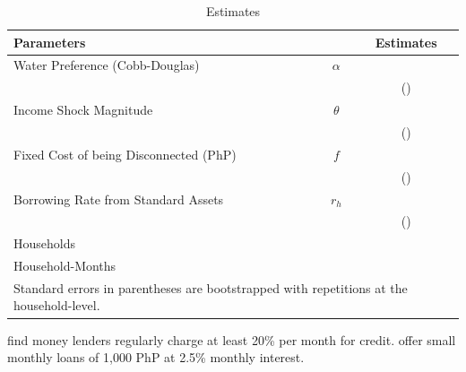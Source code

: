 \documentclass[12pt]{article}
\begin{document}
\begin{table}[h!]
\centering
\caption{Estimates}\label{table:estimates}
\vspace{-2mm}
\begin{tabular}{l*{1}{cc}}
\toprule
Parameters  &   & Estimates \\
\midrule
Water Preference (Cobb-Douglas) & $\alpha$ &  \\
 &  & (\unskip) \\[.4em]
Income Shock Magnitude & $\theta$ &  \\
 &  & (\unskip) \\[.4em]
Fixed Cost of being Disconnected (PhP) & $f$ &   \\
 &  &  (\unskip) \\[.4em]
Borrowing Rate from Standard Assets & $r_h$ &  \\
 &  & (\unskip) \\[.8em]
Households & &  \\
Household-Months & &  \\
\bottomrule
\multicolumn{3}{l}{\scriptsize Standard errors in parentheses are bootstrapped with repetitions at the household-level.} 
\end{tabular}
\end{table}



\cite{karlan2009expanding} find money lenders regularly charge at least 20\% per month for credit.  \cite{gine2014group} offer small monthly loans of 1,000 PhP at 2.5\% monthly interest.
\end{document}

